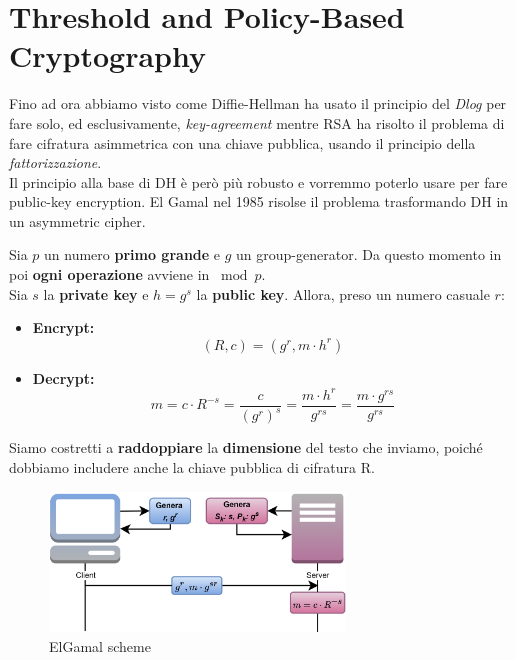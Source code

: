 \chapter{Threshold and Policy-Based Cryptography}
Fino ad ora abbiamo visto come Diffie-Hellman ha usato il principio del \textit{Dlog} per fare solo, ed esclusivamente, \textit{key-agreement} mentre RSA ha risolto il problema di fare cifratura asimmetrica con una chiave pubblica, usando il principio della \textit{fattorizzazione}.\\
Il principio alla base di DH è però più robusto e vorremmo poterlo usare per fare public-key encryption. El Gamal nel 1985 risolse il problema trasformando DH in un asymmetric cipher.
\begin{definition}[ElGamal]\label{def:elgam}
Sia $p$ un numero \textbf{primo grande} e $g$ un group-generator. Da questo momento in poi \textbf{ogni operazione} avviene in $\bmod{p}$.\\
Sia $s$ la \textbf{private key} e $h=g^s$ la \textbf{public key}. Allora, preso un numero casuale $r$:
\begin{itemize}
    \item \textbf{Encrypt:} 
    \begin{equation}\label{eq:elgenc}
    (R,c)=(g^r,m\cdot h^r)    
    \end{equation}
    \item \textbf{Decrypt:}\footnotemark
    \begin{equation}\label{eq:elgdec}
        m=c\cdot R^{-s}=\frac{c}{(g^r)^s}=\frac{m\cdot h^r}{g^{rs}}=\frac{m\cdot g^{rs}}{g^{rs}}
    \end{equation}
\end{itemize}
\begin{remark}
Siamo costretti a \textbf{raddoppiare} la \textbf{dimensione} del testo che inviamo, poiché dobbiamo includere anche la chiave pubblica di cifratura R.
\end{remark}
\end{definition}
\begin{figure}[h]
    \centering
    \includegraphics[width=0.7\textwidth]{image/threshold/elgamal.png}
    \caption{ElGamal scheme}
    \label{fig:elgam}
\end{figure}
